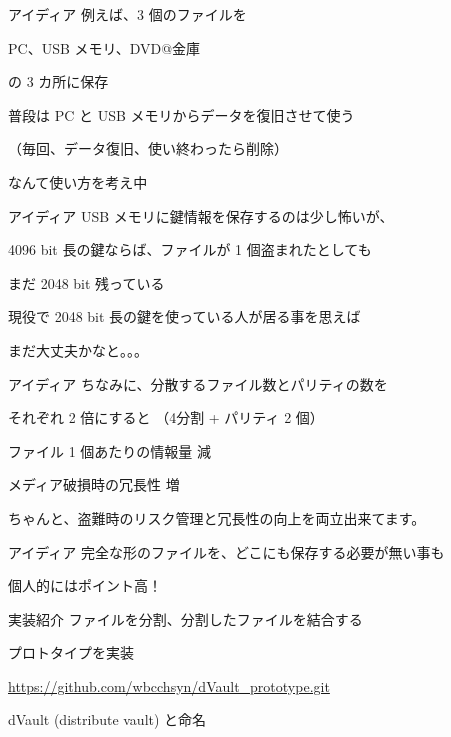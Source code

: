\begin{frame}{アイディア}{}
  例えば、3 個のファイルを

  PC、USB メモリ、DVD@金庫

  の 3 カ所に保存
  \vspace{1cm}

  普段は PC と USB メモリからデータを復旧させて使う

  （毎回、データ復旧、使い終わったら削除）

  なんて使い方を考え中
\end{frame}

\begin{frame}{アイディア}{}
  USB メモリに鍵情報を保存するのは少し怖いが、

  4096 bit 長の鍵ならば、ファイルが 1 個盗まれたとしても

  まだ 2048 bit 残っている
  \vspace{1cm}

  現役で 2048 bit 長の鍵を使っている人が居る事を思えば

  まだ大丈夫かなと。。。
\end{frame}

\begin{frame}{アイディア}{}
  ちなみに、分散するファイル数とパリティの数を

  それぞれ 2 倍にすると （4分割 + パリティ 2 個）
  \vspace{1cm}

  ファイル 1 個あたりの情報量 減

  メディア破損時の冗長性 増
  \vspace{1cm}

  ちゃんと、盗難時のリスク管理と冗長性の向上を両立出来てます。
\end{frame}

\begin{frame}{アイディア}{}
  完全な形のファイルを、どこにも保存する必要が無い事も

  個人的にはポイント高！
\end{frame}

\begin{frame}{実装紹介}{}
  ファイルを分割、分割したファイルを結合する

  プロトタイプを実装
  \vspace{1cm}

  \url{https://github.com/wbcchsyn/dVault_prototype.git}
  \vspace{1cm}

  dVault (distribute vault) と命名
\end{frame}

